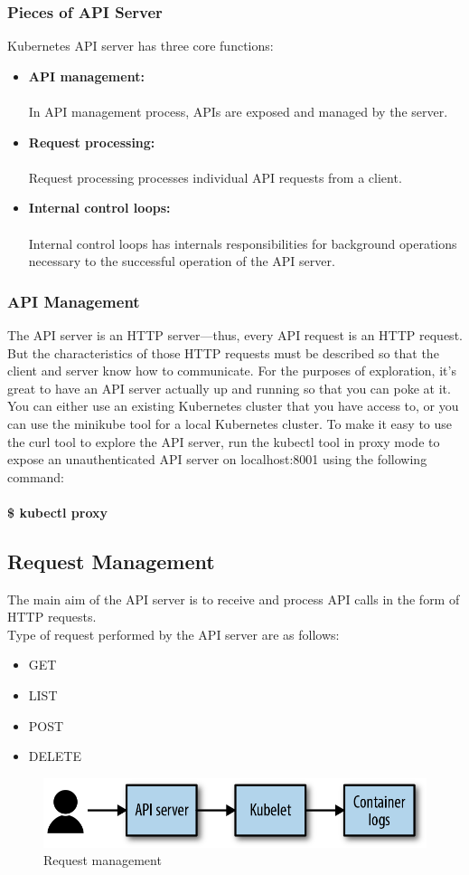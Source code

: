 \documentclass[12pt]{article}
\begin{document}
\subsubsection{Pieces of API Server}
Kubernetes API server has three core functions:
\begin{itemize}
	\item \textbf{API management:}\\\\
	In API management process, APIs are exposed and managed by the server.
	\item \textbf{Request processing:}\\\\
	Request processing processes individual API requests from a client.
	\item \textbf{Internal control loops:}\\\\
	Internal control loops has internals responsibilities for background operations necessary to the successful operation of the API server.
\end{itemize}
\subsubsection{API Management \cite{KubernetesManagement}}
The API server is an HTTP server—thus, every API request is an HTTP request. But the characteristics of those HTTP requests must be described so that the client and server know how to communicate. For the purposes of exploration, it’s great to have an API server actually up and running so that you can poke at it. You can either use an existing Kubernetes cluster that you have access to, or you can use the minikube tool for a local Kubernetes cluster. To make it easy to use the curl tool to explore the API server, run the kubectl tool in proxy mode to expose an unauthenticated API server on localhost:8001 using the following command:\\\\
\textbf{\$ kubectl proxy}
\subsection{Request Management}
The main aim of the API server is to receive and process API calls in the form of HTTP requests.\\
Type of request performed by the API server are as follows:
\begin{itemize}
	\item GET
	\item LIST
	\item POST
	\item DELETE
\end{itemize}
\begin{figure}[h!]
	\begin{center}
		\includegraphics*[totalheight=0.1\textheight]{kubereqman}
		\caption{Request management}
	\end{center}
\end{figure}
\end{document}
